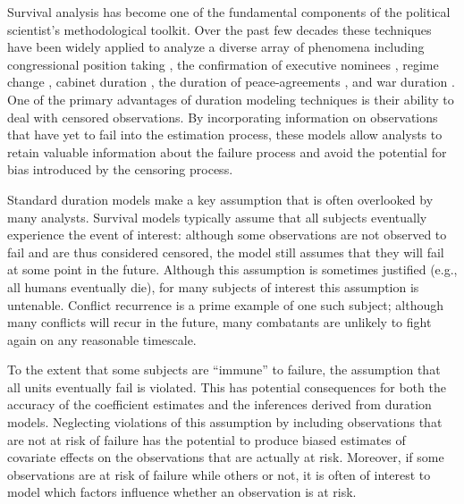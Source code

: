 \documentclass[letterpaper, 12pt]{article}
\theoremstyle{plain}
\begin{document}
\pagebreak

Survival analysis has become one of the fundamental components of the political scientist's methodological toolkit. Over the past few decades these techniques have been widely applied to analyze a diverse array of phenomena including  congressional position taking \citep{box-steffensmeier1997}, the confirmation of executive nominees \citep{ostrander2015}, regime change \citep{gates2016}, cabinet duration \citep{somer-topcu2008}, the duration of peace-agreements \citep{fortna2004b}, and war duration \citep{weisiger2013}. One of the primary advantages of duration modeling techniques is their ability to deal with censored observations. By incorporating information on observations that have yet to fail into the estimation process, these models allow analysts to retain valuable information about the failure process and avoid the potential for bias introduced by the censoring process. 

Standard duration models make a key assumption that is often overlooked by many analysts. Survival models typically assume that all subjects eventually experience the event of interest: although some observations are not observed to fail and are thus considered censored, the model still assumes that they will fail at some point in the future. Although this assumption is sometimes justified (e.g., all humans eventually die), for many subjects of interest this assumption is untenable. Conflict recurrence is a prime example of one such subject; although many conflicts will recur in the future, many combatants are unlikely to fight again on any reasonable timescale. 

To the extent that some subjects are “immune” to failure, the assumption that all units eventually fail is violated. This has potential consequences for both the accuracy of the coefficient estimates and the inferences derived from duration models. Neglecting violations of this assumption by including observations that are not at risk of failure has the potential to produce biased estimates of covariate effects on the observations that are actually at risk. Moreover, if some observations are at risk of failure while others or not, it is often of interest to model which factors influence whether an observation is at risk.

\end{document}
